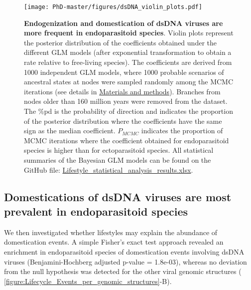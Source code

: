 \begin{figure}[!htbp]
 \centering
  \texttt{[image: PhD-master/figures/dsDNA\_violin\_plots.pdf]}
\caption[Paper1:Violin plot GLM coefficients distribution of dsDNA Events and dEvents]{\textbf{Endogenization and domestication of dsDNA viruses are more frequent in endoparasitoid species}. Violin plots represent the posterior distribution of the coefficients obtained under the different GLM models (after exponential transformation to obtain a rate relative to free-living species). The coefficients are derived from 1000 independent GLM models, where 1000 probable scenarios of ancestral states at nodes were sampled randomly among the MCMC iterations (see details in  \hyperref[sec:MM-12]{Materials and methods}). Branches from nodes older than 160 million years were removed from the dataset. The \%pd is the probability of direction and indicates the proportion of the posterior distribution where the coefficients have the same sign as the median coefficient. $P_{MCMC}$ indicates the proportion of MCMC iterations where the coefficient obtained for endoparasitoid species is higher than for ectoparasitoid species. All statistical summaries of the Bayesian GLM models can be found on the GitHub file: \href{https://github.com/BenjaminGuinet/PhD_defense/blob/main/Supplementary_paper1/Lifestyle_statistical_analysis_results.xlsx}{Lifestyle\_statistical\_analysis\_results.xlsx}.}
\label{figure:dsDNA_violin_plot}
\end{figure}

\subsection{Domestications of dsDNA viruses are most prevalent in endoparasitoid species}

We then investigated whether lifestyles may explain the abundance of domestication events. A simple Fisher's exact test approach revealed an enrichment in endoparasitoid species of domestication events involving dsDNA viruses (Benjamini-Hochberg adjusted p-value = 1.8e-03), whereas no deviation from the null hypothesis was detected for the other viral genomic structures (\figurename{ \ref{figure:Lifecycle_Events_per_genomic_structures}-B}).

